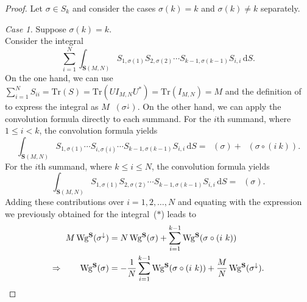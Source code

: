 \documentclass[a4paper]{article}
\theoremstyle{plain}
\numberwithin{theorem}{section}
\theoremstyle{definition}
\theoremstyle{remark}
\newcommand{\dd}{\mathrm{d}}
\renewcommand{\leq}{\leqslant}
\newcommand{\SM}{\mathbf{S}}			%
\newcommand{\sm}{S}					%
\DeclareMathOperator{\SW}{Wg^{\SM}}		%
\begin{document}
\begin{proof}
Let $\sigma \in S_k$ and consider the cases $\sigma(k) = k$ and $\sigma(k) \neq k$ separately.


{\em Case 1.} Suppose $\sigma(k) = k$. \\
Consider the integral
\begin{equation*} \label{eq:orthogonality1}
\sum_{i=1}^N \int_{\SM(M,N)} \sm_{1,\sigma(1)} \sm_{2,\sigma(2)} \cdots \sm_{k-1,\sigma(k-1)} \sm_{i,i} \, \dd \sm. \tag{$\ast$}
\end{equation*}
On the one hand, we can use $\sum_{i=1}^N \sm_{ii} = \mathrm{Tr}(\sm) = \mathrm{Tr}(UI_{M,N}U^*) = \mathrm{Tr}(I_{M,N}) = M$ and the definition of $\SW$ to express the integral as $M \SW(\sigma^\downarrow)$. On the other hand, we can apply the convolution formula directly to each summand. For the $i$th summand, where $1 \leq i < k$, the convolution formula yields
\[
\int_{ \SM(M,N) } \sm_{1,\sigma(1)} \cdots S_{i,\sigma(i)} \cdots \sm_{k-1,\sigma(k-1)} \sm_{i,i} \, \dd \sm = \SW(\sigma) + \SW(\sigma \circ (i~k)).
\]
For the $i$th summand, where $k \leq i \leq N$, the convolution formula yields
\[
\int_{ \SM(M,N) } \sm_{1, \sigma(1)} \sm_{2, \sigma(2)} \cdots \sm_{k-1, \sigma(k-1)} \sm_{i,i} \, \dd \sm = \SW(\sigma).
\]
Adding these contributions over $i = 1, 2, \ldots, N$ and equating with the expression we previously obtained for the integral~($\ast$) leads to
\begin{align} \label{eq:weingarten1}
M \SW(\sigma^\downarrow) &= N \SW(\sigma) + \sum_{i=1}^{k-1} \SW(\sigma \circ (i~k)) \notag \\
\Rightarrow \qquad \SW(\sigma) &= - \frac{1}{N} \sum_{i=1}^{k-1} \SW(\sigma \circ (i~k)) + \frac{M}{N} \SW(\sigma^\downarrow).
\end{align}



\end{proof}
\end{document}
